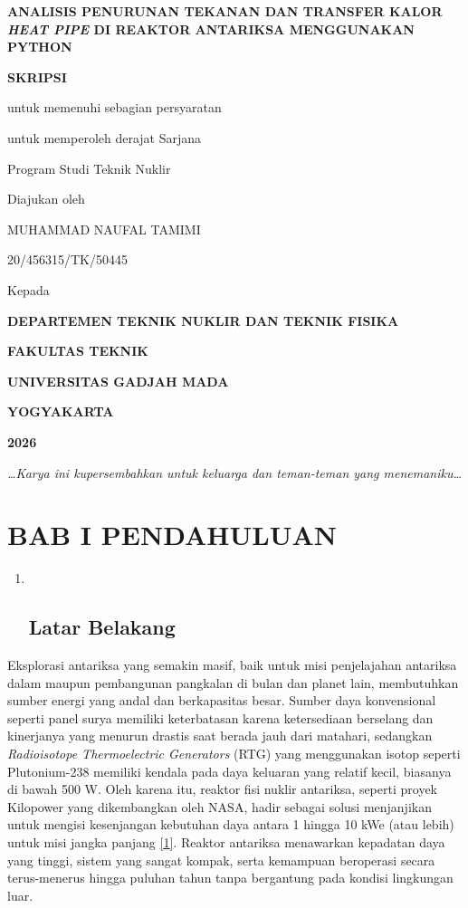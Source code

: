 \documentclass[
]{article}
\author{}
\date{}
\begin{document}
\textbf{ANALISIS PENURUNAN TEKANAN DAN TRANSFER KALOR \emph{HEAT PIPE}
DI REAKTOR ANTARIKSA MENGGUNAKAN PYTHON}

\textbf{SKRIPSI}

untuk memenuhi sebagian persyaratan

untuk memperoleh derajat Sarjana

Program Studi Teknik Nuklir

Diajukan oleh

MUHAMMAD NAUFAL TAMIMI

20/456315/TK/50445

Kepada

\textbf{DEPARTEMEN TEKNIK NUKLIR DAN TEKNIK FISIKA}

\textbf{FAKULTAS TEKNIK}

\textbf{UNIVERSITAS GADJAH MADA}

\textbf{YOGYAKARTA}

\textbf{2026}

\emph{\ldots Karya ini kupersembahkan untuk keluarga dan teman-teman
yang menemaniku\ldots{}}

\section{\texorpdfstring{\textbf{BAB I}
\textbf{PENDAHULUAN}}{BAB I PENDAHULUAN}}\label{bab-i-pendahuluan}

\begin{enumerate}
\def\labelenumi{\arabic{enumi}.}
\item ~
  \subsection{\texorpdfstring{\textbf{Latar
  Belakang}}{Latar Belakang}}\label{latar-belakang}
\end{enumerate}

Eksplorasi antariksa yang semakin masif, baik untuk misi penjelajahan
antariksa dalam maupun pembangunan pangkalan di bulan dan planet lain,
membutuhkan sumber energi yang andal dan berkapasitas besar. Sumber daya
konvensional seperti panel surya memiliki keterbatasan karena
ketersediaan berselang dan kinerjanya yang menurun drastis saat berada
jauh dari matahari, sedangkan \emph{Radioisotope Thermoelectric
Generators} (RTG) yang menggunakan isotop seperti Plutonium-238 memiliki
kendala pada daya keluaran yang relatif kecil, biasanya di bawah 500 W.
Oleh karena itu, reaktor fisi nuklir antariksa, seperti proyek Kilopower
yang dikembangkan oleh NASA, hadir sebagai solusi menjanjikan untuk
mengisi kesenjangan kebutuhan daya antara 1 hingga 10 kWe (atau lebih)
untuk misi jangka panjang
\href{https://www.zotero.org/google-docs/?e7LRKG}{{[}1{]}}. Reaktor
antariksa menawarkan kepadatan daya yang tinggi, sistem yang sangat
kompak, serta kemampuan beroperasi secara terus-menerus hingga puluhan
tahun tanpa bergantung pada kondisi lingkungan luar.
\end{document}

